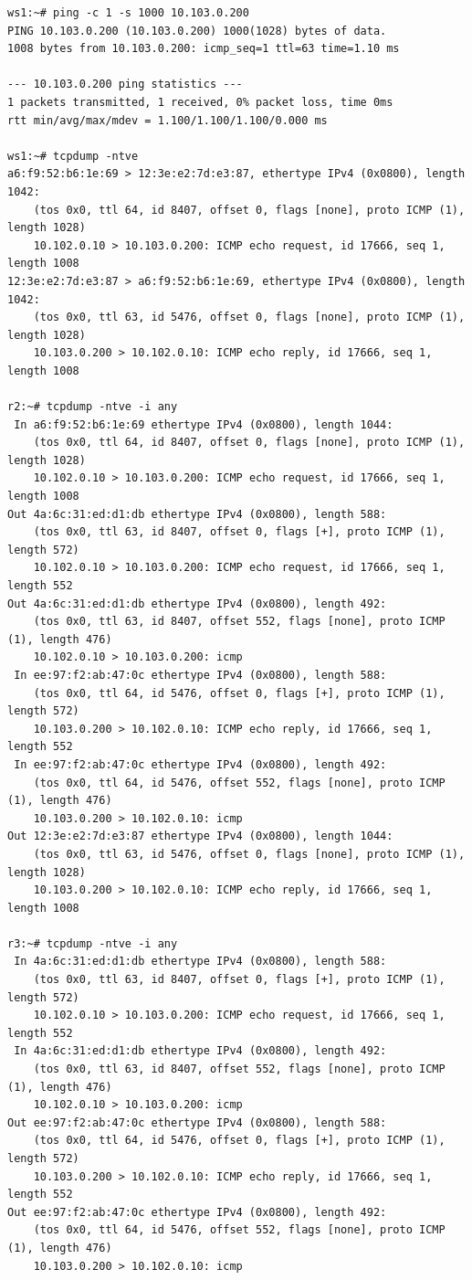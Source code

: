 \documentclass[a4paper,12pt]{article}
\begin{document}
\begin{Verbatim}
ws1:~# ping -c 1 -s 1000 10.103.0.200
PING 10.103.0.200 (10.103.0.200) 1000(1028) bytes of data.
1008 bytes from 10.103.0.200: icmp_seq=1 ttl=63 time=1.10 ms

--- 10.103.0.200 ping statistics ---
1 packets transmitted, 1 received, 0% packet loss, time 0ms
rtt min/avg/max/mdev = 1.100/1.100/1.100/0.000 ms

ws1:~# tcpdump -ntve
a6:f9:52:b6:1e:69 > 12:3e:e2:7d:e3:87, ethertype IPv4 (0x0800), length 1042:
    (tos 0x0, ttl 64, id 8407, offset 0, flags [none], proto ICMP (1), length 1028)
    10.102.0.10 > 10.103.0.200: ICMP echo request, id 17666, seq 1, length 1008
12:3e:e2:7d:e3:87 > a6:f9:52:b6:1e:69, ethertype IPv4 (0x0800), length 1042:
    (tos 0x0, ttl 63, id 5476, offset 0, flags [none], proto ICMP (1), length 1028)
    10.103.0.200 > 10.102.0.10: ICMP echo reply, id 17666, seq 1, length 1008

r2:~# tcpdump -ntve -i any
 In a6:f9:52:b6:1e:69 ethertype IPv4 (0x0800), length 1044:
    (tos 0x0, ttl 64, id 8407, offset 0, flags [none], proto ICMP (1), length 1028)
    10.102.0.10 > 10.103.0.200: ICMP echo request, id 17666, seq 1, length 1008
Out 4a:6c:31:ed:d1:db ethertype IPv4 (0x0800), length 588:
    (tos 0x0, ttl 63, id 8407, offset 0, flags [+], proto ICMP (1), length 572)
    10.102.0.10 > 10.103.0.200: ICMP echo request, id 17666, seq 1, length 552
Out 4a:6c:31:ed:d1:db ethertype IPv4 (0x0800), length 492:
    (tos 0x0, ttl 63, id 8407, offset 552, flags [none], proto ICMP (1), length 476)
    10.102.0.10 > 10.103.0.200: icmp
 In ee:97:f2:ab:47:0c ethertype IPv4 (0x0800), length 588:
    (tos 0x0, ttl 64, id 5476, offset 0, flags [+], proto ICMP (1), length 572)
    10.103.0.200 > 10.102.0.10: ICMP echo reply, id 17666, seq 1, length 552
 In ee:97:f2:ab:47:0c ethertype IPv4 (0x0800), length 492:
    (tos 0x0, ttl 64, id 5476, offset 552, flags [none], proto ICMP (1), length 476)
    10.103.0.200 > 10.102.0.10: icmp
Out 12:3e:e2:7d:e3:87 ethertype IPv4 (0x0800), length 1044:
    (tos 0x0, ttl 63, id 5476, offset 0, flags [none], proto ICMP (1), length 1028)
    10.103.0.200 > 10.102.0.10: ICMP echo reply, id 17666, seq 1, length 1008

r3:~# tcpdump -ntve -i any
 In 4a:6c:31:ed:d1:db ethertype IPv4 (0x0800), length 588:
    (tos 0x0, ttl 63, id 8407, offset 0, flags [+], proto ICMP (1), length 572)
    10.102.0.10 > 10.103.0.200: ICMP echo request, id 17666, seq 1, length 552
 In 4a:6c:31:ed:d1:db ethertype IPv4 (0x0800), length 492:
    (tos 0x0, ttl 63, id 8407, offset 552, flags [none], proto ICMP (1), length 476)
    10.102.0.10 > 10.103.0.200: icmp
Out ee:97:f2:ab:47:0c ethertype IPv4 (0x0800), length 588:
    (tos 0x0, ttl 64, id 5476, offset 0, flags [+], proto ICMP (1), length 572)
    10.103.0.200 > 10.102.0.10: ICMP echo reply, id 17666, seq 1, length 552
Out ee:97:f2:ab:47:0c ethertype IPv4 (0x0800), length 492:
    (tos 0x0, ttl 64, id 5476, offset 552, flags [none], proto ICMP (1), length 476)
    10.103.0.200 > 10.102.0.10: icmp
\end{Verbatim}
\end{document}

